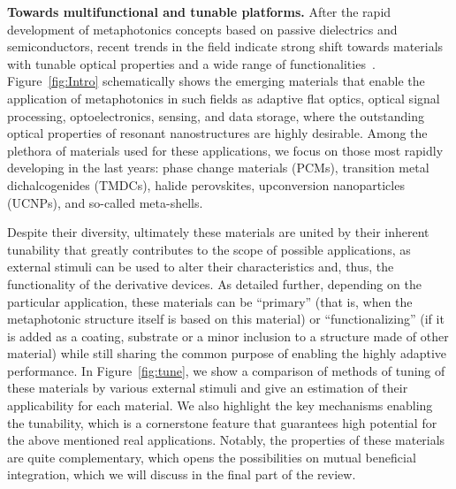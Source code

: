\documentclass[journal=chreay,manuscript=review]{achemso}
\begin{document}
{\bf Towards multifunctional and tunable platforms.} After the rapid development of metaphotonics concepts based on passive dielectrics and semiconductors, recent trends in the field indicate strong shift towards materials with tunable optical properties and a wide range of functionalities~\cite{minovich2015functional,li2017nonlinear,makarov2017light,nemati2018tunable}. Figure~\ref{fig:Intro} schematically shows the emerging materials that enable the application of metaphotonics in such fields as adaptive flat optics, optical signal processing, optoelectronics, sensing, and data storage, where the outstanding optical properties of resonant nanostructures are highly desirable. Among the plethora of materials used for these applications, we focus on those most rapidly developing in the last years: phase change materials (PCMs), transition metal dichalcogenides (TMDCs), halide perovskites, upconversion nanoparticles (UCNPs), and so-called meta-shells. 

Despite their diversity, ultimately these materials are united by their inherent tunability that greatly contributes to the scope of possible applications, as external stimuli can be used to alter their characteristics and, thus, the functionality of the derivative devices. As detailed further, depending on the particular application, these materials can be ``primary'' (that is, when the metaphotonic structure itself is based on this material) or ``functionalizing'' (if it is added as a coating, substrate or a minor inclusion to a structure made of other material) while still sharing the common purpose of enabling the highly adaptive performance. In Figure~\ref{fig:tune}, we show a comparison of methods of tuning of these materials by various external stimuli and give an estimation of their applicability for each material. We also highlight the key mechanisms enabling the tunability, which is a cornerstone feature that guarantees high potential for the above mentioned real applications. Notably, the properties of these materials are quite complementary, which opens the possibilities on mutual beneficial integration, which we will discuss in the final part of the review.
\end{document}
